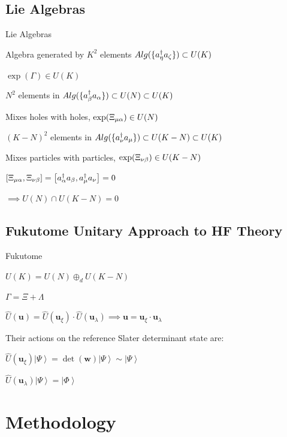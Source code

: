 \documentclass[professionalfonts]{beamer}
\newcommand{\ket}[1]{\ensuremath{\left|#1\right\rangle}}
\newcommand{\elec}{N}
\newcommand{\orb}{K}
\newcommand{\anio}[1]{a_{\oo{#1}}}
\newcommand{\aniu}[1]{a_{\uo{#1}}}
\newcommand{\anig}[1]{a_{\go{#1}}}
\newcommand{\creo}[1]{a^\dagger_{\oo{#1}}}
\newcommand{\creu}[1]{a^\dagger_{\uo{#1}}}
\newcommand{\creg}[1]{a^\dagger_{\go{#1}}}
\newcommand{\ind}[1]{{\uo #1 \oo #1}}
\newcommand{\uo}[1]{
		\IfEqCase{#1}{
			{0}{\mu}
			{1}{\nu}
			{2}{\xi}
		}[\PackageError{uo}{Undefined option to uo: #1}{}]
}
\newcommand{\oo}[1]{
		\IfEqCase{#1}{
			{0}{\alpha}
			{1}{\beta}
			{2}{\gamma}
		}[\PackageError{unocorb}{Undefined option to unuo: #1}{}]
}
\newcommand{\go}[1]{
		\IfEqCase{#1}{
			{0}{\zeta}
			{1}{\eta}
			{2}{\iota}
			{3}{\kappa}
		}[\PackageError{unocorb}{Undefined option to go: #1}{}]
}
\newcommand{\SubItem}[1]{
    {\setlength\itemindent{15pt} \item[*] #1}
}
\begin{document}
\subsection{\textbf{Lie Algebras}}

\begin{frame}{Lie Algebras}
	\begin{itemize}
		\item Algebra generated by $\orb^2$ elements $Alg(\{\creg 1 \anig 0\}) \subset U(\orb)$
			\SubItem{$\exp(\Gamma) \in U(\orb)$}

		\item $\elec^2$ elements in $Alg(\{\creo 1 \anio 0\}) \subset U(\elec) \subset U(\orb)$
			\SubItem{Mixes holes with holes, $\exp(\Xi_{\ind 0}) \in U(\elec)$}
		\item $(\orb - \elec)^2$ elements in $Alg(\{\creu 1 \aniu 0\}) \subset U(\orb - \elec) \subset U(\orb)$
			\SubItem{Mixes particles with particles, $\exp(\Xi_{\ind 1}) \in U(\orb - \elec)$}
			\SubItem{$\left[\Xi_\ind 0, \Xi _\ind 1\right] = \left[\creo 0 \anio 1, \creu 0 \aniu 1\right] = 0$}
			\SubItem{$\implies {U(\elec) \cap U(\orb - \elec) = 0}$}
	\end{itemize}
\end{frame}

\subsection {\textbf{Fukutome Unitary Approach to HF Theory}}

\begin{frame}{Fukutome}
	\begin{itemize}
		\item $U(\orb) = U(\elec) \oplus_d U(\orb - \elec)$
			\SubItem{$\Gamma = \Xi + \Lambda$}
			\SubItem{
			\(
				\hat U(\bm u) = 
				\hat U(\bm u_\xi) \cdot 
				\hat U(\bm u_\lambda) \implies 
				\bm u = 
				\bm u_\xi \cdot 
				\bm u_\lambda
				\)
			}
		\item Their actions on the reference Slater determinant state are:
			\SubItem{
				\(
					\hat U(\bm u_\xi) \ket\Psi
					= \det(\bm w)\ket\Psi \sim \ket \Psi
				\)
			}
			\SubItem{
				\(
					\hat U(\bm u_\lambda) \ket\Psi
					= \ket\Phi
				\)
			}
	\end{itemize}
\end{frame}

\section{\textbf{Methodology}}\label{chap:methodology}
\end{document}
